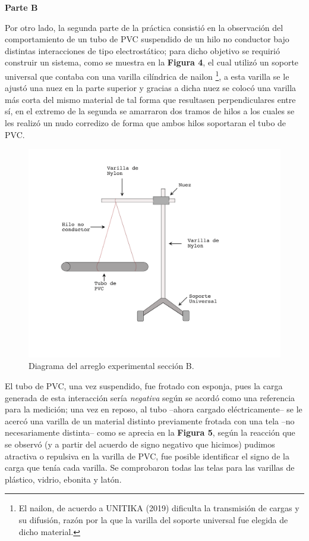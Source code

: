 \documentclass[letterpaper, 11 pt]{article}
\begin{document}
\begin{multicols*}{2}
\textbf{Parte B}

Por otro lado, la segunda parte de la práctica consistió en la observación del comportamiento de un tubo de PVC suspendido de un hilo no conductor bajo distintas interacciones de tipo electrostático; para dicho objetivo se requirió construir un sistema, como se muestra en la \textbf{Figura 4}, el cual utilizó un soporte universal que contaba con una varilla cilíndrica de nailon \footnote{El nailon, de acuerdo a UNITIKA (2019) dificulta la transmisión de cargas y su difusión, razón por la que la varilla del soporte universal fue elegida de dicho material.}, a esta varilla se le ajustó una nuez en la parte superior y gracias a dicha nuez se colocó una varilla más corta del mismo material de tal forma que resultasen perpendiculares entre sí, en el extremo de la segunda se amarraron dos tramos de hilos a los cuales se les realizó un nudo corredizo de forma que ambos hilos soportaran el tubo de PVC.
\begin{figure}[H]
    \includegraphics[scale=0.18]{mamalon2.png}
    \centering
    \caption{Diagrama del arreglo experimental sección B.}
\end{figure}
El tubo de PVC, una vez suspendido, fue frotado con esponja, pues la carga generada de esta interacción sería \textit{negativa} según se acordó como una referencia para la medición; una vez en reposo, al tubo --ahora cargado eléctricamente-- se le acercó una varilla de un material distinto previamente frotada con una tela --no necesariamente distinta-- como se aprecia en la \textbf{Figura 5}, según la reacción que se observó (y a partir del acuerdo de signo negativo que hicimos) pudimos atractiva o repulsiva en la varilla de PVC, fue posible identificar el signo de la carga que tenía cada varilla. Se comprobaron todas las telas para las varillas de plástico, vidrio, ebonita y latón.



\end{multicols*}
\end{document}
